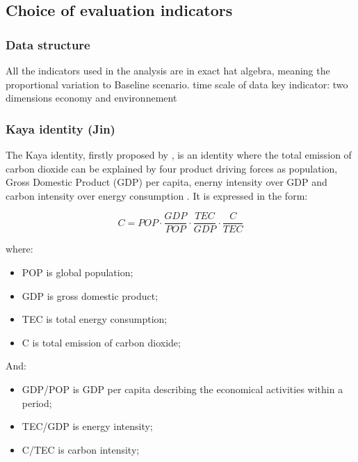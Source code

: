 \documentclass[
]{article}
\providecommand{\tightlist}{%
  \setlength{\itemsep}{0pt}\setlength{\parskip}{0pt}}
\begin{document}
\hypertarget{choice-of-evaluation-indicators}{%
\subsection{Choice of evaluation
indicators}\label{choice-of-evaluation-indicators}}

\hypertarget{data-structure}{%
\subsubsection{Data structure}\label{data-structure}}

All the indicators used in the analysis are in exact hat algebra,
meaning the proportional variation to Baseline scenario. time scale of
data key indicator: two dimensions economy and environnement

\hypertarget{kaya-identity-jin}{%
\subsubsection{Kaya identity (Jin)}\label{kaya-identity-jin}}

The Kaya identity, firstly proposed by \autocite{kaya1989}, is an
identity where the total emission of carbon dioxide can be explained by
four product driving forces as population, Gross Domestic Product (GDP)
per capita, enerny intensity over GDP and carbon intensity over energy
consumption \autocite{kayaide2021}. It is expressed in the form:

\[ C = POP \cdot \frac{GDP}{POP} \cdot \frac{TEC}{GDP} \cdot \frac{C}{TEC} \tag{1}\]

where:

\begin{itemize}
\tightlist
\item
  POP is global population;
\item
  GDP is gross domestic product;
\item
  TEC is total energy consumption;
\item
  C is total emission of carbon dioxide;
\end{itemize}

And:

\begin{itemize}
\tightlist
\item
  GDP/POP is GDP per capita describing the economical activities within
  a period;
\item
  TEC/GDP is energy intensity;
\item
  C/TEC is carbon intensity;
\end{itemize}
\end{document}
